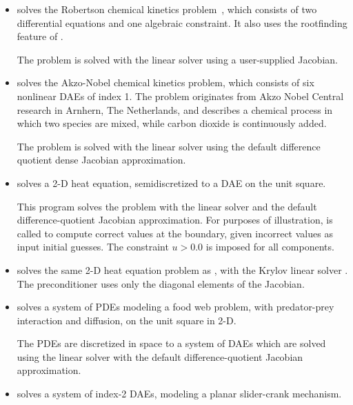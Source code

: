 \begin{itemize}


\item {}
  solves the Robertson chemical kinetics problem~\cite{Rob:66}, which consists
  of two differential equations and one algebraic constraint.  It also uses
  the rootfinding feature of {\idas}.

  The problem is solved with the {\idadense} linear solver using
  a user-supplied Jacobian.

\item {}
  solves the Akzo-Nobel chemical kinetics problem, which consists
  of six nonlinear DAEs of index 1. 
  The problem originates from Akzo Nobel Central research in Arnhern,
  The Netherlands, and describes a chemical process in which two
  species are mixed, while carbon dioxide is continuously added.

  The problem is solved with the {\idadense} linear solver using the
  default difference quotient dense Jacobian approximation.

\item {}
  solves a 2-D heat equation, semidiscretized to a DAE on the unit square.

  This program solves the problem with the {\idaband} linear solver and
  the default difference-quotient Jacobian approximation. For purposes of
  illustration,  is called to compute correct values at the
  boundary, given incorrect values as input initial guesses. The constraint
  $u > 0.0$ is imposed for all components.

\item {}
  solves the same 2-D heat equation problem as , with the Krylov
  linear solver {\idaspgmr}. The preconditioner uses only the diagonal elements
  of the Jacobian.

\item {}
  solves a system of PDEs modeling a food web problem, with predator-prey
  interaction and diffusion, on the unit square in 2-D.

  The PDEs are discretized in space to a system of DAEs which are solved
  using the {\idaband} linear solver with the default difference-quotient 
  Jacobian approximation.

\item {}
  solves a system of index-2 DAEs, modeling a planar slider-crank mechanism.


\end{itemize}

